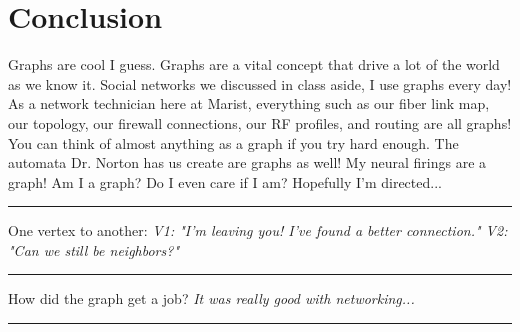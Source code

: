 \documentclass[letterpaper, 10pt]{article}
\begin{document}
\section{Conclusion}
Graphs are cool I guess. Graphs are a vital concept that drive a lot of the world as we know it. Social networks we discussed in class aside, I use graphs every day! As a network technician here at Marist, everything such as our fiber link map, our topology, our firewall connections, our RF profiles, and routing are all graphs! You can think of almost anything as a graph if you try hard enough. The automata Dr. Norton has us create are graphs as well! My neural firings are a graph! Am I a graph? Do I even care if I am? Hopefully I'm directed... \\

\hrule
\vspace{.25cm}
One vertex to another: \textit{V1: "I'm leaving you! I've found a better connection." V2: "Can we still be neighbors?"}
\vspace{.25cm}
\hrule
\vspace{.25cm}
How did the graph get a job? \textit{It was really good with networking...}
\vspace{.25cm}
\hrule
\end{document}
